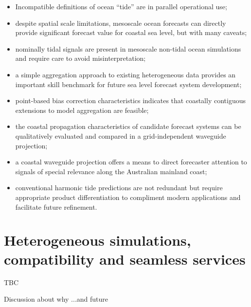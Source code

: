 \begin{itemize}
    \item Incompatible definitions of ocean ``tide'' are in parallel operational use;
    \item despite spatial scale limitations, mesoscale ocean forecasts can directly provide significant forecast value for coastal sea level, but with many caveats;
    \item nominally tidal signals are present in mesoscale non-tidal ocean simulations and require care to avoid misinterpretation; 
    \item a simple aggregation approach to existing heterogeneous data provides an important skill benchmark for future sea level forecast system development; 
    \item point-based bias correction characteristics indicates that coastally contiguous extensions to model aggregation are feasible;
    \item the coastal propagation characteristics of candidate forecast systems can be qualitatively evaluated and compared in a grid-independent waveguide projection; 
    \item a coastal waveguide projection offers a means to direct forecaster attention to signals of special relevance along the Australian mainland coast;
    \item conventional harmonic tide predictions are not redundant but require appropriate product differentiation to compliment modern applications and facilitate future refinement.
\end{itemize}


\section{Heterogeneous simulations, compatibility and seamless services}


TBC

Discussion about why ...and future 



